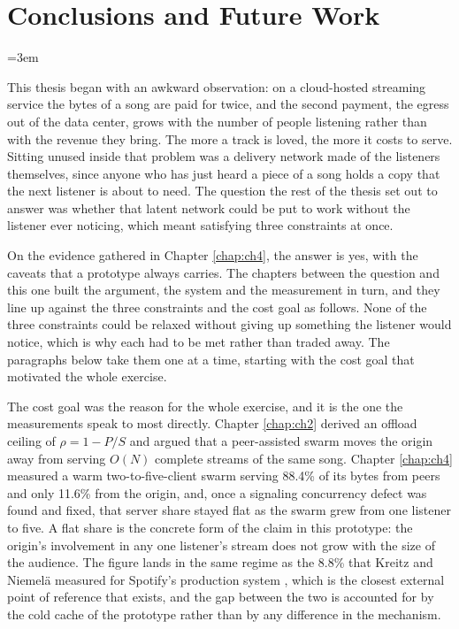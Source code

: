 \chapter{Conclusions and Future Work}
\label{chap:ch5}

\emergencystretch=3em

\indent \par This thesis began with an awkward observation: on a cloud-hosted streaming service the bytes of a song are paid for twice, and the second payment, the egress out of the data center, grows with the number of people listening rather than with the revenue they bring. The more a track is loved, the more it costs to serve. Sitting unused inside that problem was a delivery network made of the listeners themselves, since anyone who has just heard a piece of a song holds a copy that the next listener is about to need. The question the rest of the thesis set out to answer was whether that latent network could be put to work without the listener ever noticing, which meant satisfying three constraints at once.

\par On the evidence gathered in Chapter \ref{chap:ch4}, the answer is yes, with the caveats that a prototype always carries. The chapters between the question and this one built the argument, the system and the measurement in turn, and they line up against the three constraints and the cost goal as follows. None of the three constraints could be relaxed without giving up something the listener would notice, which is why each had to be met rather than traded away. The paragraphs below take them one at a time, starting with the cost goal that motivated the whole exercise.

\indent \par The cost goal was the reason for the whole exercise, and it is the one the measurements speak to most directly. Chapter \ref{chap:ch2} derived an offload ceiling of $\rho = 1 - P/S$ and argued that a peer-assisted swarm moves the origin away from serving $O(N)$ complete streams of the same song. Chapter \ref{chap:ch4} measured a warm two-to-five-client swarm serving 88.4\% of its bytes from peers and only 11.6\% from the origin, and, once a signaling concurrency defect was found and fixed, that server share stayed flat as the swarm grew from one listener to five. A flat share is the concrete form of the claim in this prototype: the origin's involvement in any one listener's stream does not grow with the size of the audience. The figure lands in the same regime as the 8.8\% that Kreitz and Niemel\"a measured for Spotify's production system \cite{spotify_p2p}, which is the closest external point of reference that exists, and the gap between the two is accounted for by the cold cache of the prototype rather than by any difference in the mechanism.

